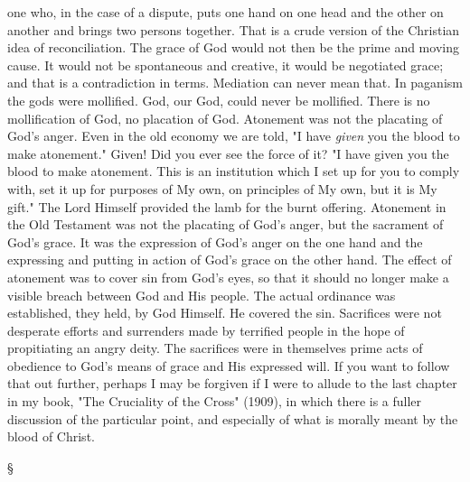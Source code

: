 \documentclass[12pt,letterpaper,oneside]{book}
\begin{document}
one who, in the case of a dispute, puts one hand 
on one head and the other on another and 
brings two persons together. That is a crude 
version of the Christian idea of reconciliation. 
The grace of God would not then be the prime 
and moving cause. It would not be spontaneous 
and creative, it would be negotiated grace; and 
that is a contradiction in terms. Mediation can 
never mean that. In paganism the gods were 
mollified. God, our God, could never be mollified. 
There is no mollification of God, no placation of 
God. Atonement was not the placating of God's 
anger. Even in the old economy we are told, "I 
have \textit{given} you the blood to make atonement." 
Given! Did you ever see the force of it? "I 
have given you the blood to make atonement. 
This is an institution which I set up for you to 
comply with, set it up for purposes of My own, 
on principles of My own, but it is My gift." The 
Lord Himself provided the lamb for the burnt 
offering. Atonement in the Old Testament was 
not the placating of God's anger, but the sacrament 
of God's grace. It was the expression 
of God's anger on the one hand and the expressing 
and putting in action of God's grace on the 
other hand. The effect of atonement was to 
cover sin from God's eyes, so that it should no 
longer make a visible breach between God and 
His people. The actual ordinance was established, 
they held, by God Himself. He covered 
the sin. Sacrifices were not desperate efforts and 
surrenders made by terrified people in the hope 
of propitiating an angry deity. The sacrifices 
were in themselves prime acts of obedience 
to God's means of grace and His expressed will. 
If you want to follow that out further, perhaps 
I may be forgiven if I were to allude to the 
last chapter in my book, "The Cruciality of 
the Cross" (1909), in which there is a fuller 
discussion of the particular point, and especially 
of what is morally meant by the blood of 
Christ. 

\begin{center}
\S
\end{center}
\end{document}
